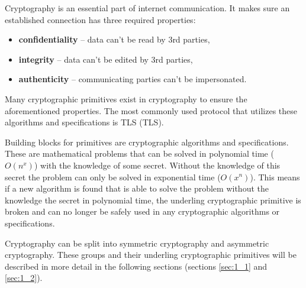 
Cryptography is an essential part of internet communication. It makes sure an established connection has three required properties\cite{Bernstein149}:
\begin{itemize}
  \item \textbf{confidentiality} -- data can't be read by 3rd parties,
  \item \textbf{integrity} -- data can't be edited by 3rd parties,
  \item \textbf{authenticity} -- communicating parties can't be impersonated.
\end{itemize}
Many cryptographic primitives exist in cryptography to ensure the aforementioned properties. The most commonly used protocol that utilizes these algorithms and specifications is TLS (\acl{TLS}).

Building blocks for primitives are cryptographic algorithms and specifications. These are mathematical problems that can be solved in polynomial time ($O(n^x)$) with the knowledge of some secret. Without the knowledge of this secret the problem can only be solved in exponential time ($O(x^n)$). This means if a new algorithm is found that is able to solve the problem without the knowledge the secret in polynomial time, the underling cryptographic primitive is broken and can no longer be safely used in any cryptographic algorithms or specifications.\cite{Smart2004}

Cryptography can be split into symmetric cryptography and asymmetric cryptography. These groups and their underling cryptographic primitives will be described in more detail in the following sections (sections \ref{sec:1_1} and \ref{sec:1_2}).



